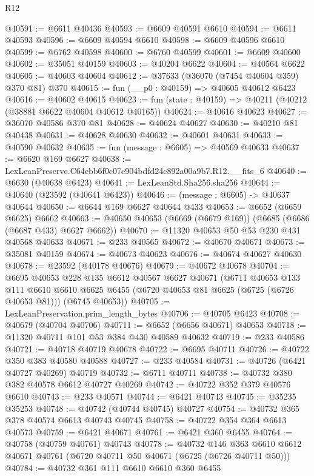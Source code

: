 \begin{lexlean}{R12}
\begin{coremodule}
@40591 := @6611 @40436
@40593 := @6609 @40591 @6610
@40594 := @6611 @40593
@40596 := @6609 @40594 @6610
@40598 := @6609 @40596 @6610
@40599 := @6762 @40598
@40600 := @6760 @40599
@40601 := @6609 @40600
@40602 := @35051 @40159
@40603 := @40204 @6622
@40604 := @40564 @6622
@40605 := @40603 @40604
@40612 := @37633 (@36070 (@7454 @40604 @359) @370 @81) @370
@40615 := fun (__p0 : @40159) => @40605 @40612 @6423
@40616 := @40602 @40615
@40623 := fun (state : @40159) => @40211 (@40212 (@38881 @6622 @40604 @40612 @40165))
@40624 := @40616 @40623
@40627 := @36070 @40586 @370 @81
@40628 := @40624 @40627
@40630 := @40210 @81 @40438
@40631 := @40628 @40630
@40632 := @40601 @40631
@40633 := @40590 @40632
@40635 := fun (message : @6605) => @40569 @40633
@40637 := @6620 @169 @6627
@40638 := LexLeanPreserve.C64ebb6f0c07e904bdfd24c892a00a9b7.R12.__fits_6
@40640 := @6630 (@40638 @6423)
@40641 := LexLeanStd.Sha256.sha256
@40644 := @40640 (@23592 (@40641 @6423))
@40646 := (message : @6605) -> @40637 @40644
@40650 := @6644 @169 @6627 @40644 @433
@40653 := @6652 (@6659 @6625) @6662
@40663 := @40650 @40653 (@6669 (@6679 @169)) (@6685 (@6686 (@6687 @433) @6627 @6662))
@40670 := @11320 @40653 @50 @53 @230 @431 @40568 @40633
@40671 := @233 @40565
@40672 := @40670 @40671
@40673 := @35081 @40159
@40674 := @40673 @40623
@40676 := @40674 @40627 @40630
@40678 := @23592 (@40178 @40676)
@40679 := @40672 @40678
@40704 := @6695
    @40653
    @228
    @135
    @6612
    @40567
    @6627
    @40671
    (@6711
      @40653
      @133
      @111
      @6610
      @6610
      @6625
      @6455
      (@6720 @40653 @81 @6625 (@6725 (@6726 @40653 @81)))
      (@6745 @40653))
@40705 := LexLeanPreservation.prim_length_bytes
@40706 := @40705 @6423
@40708 := @40679 (@40704 @40706)
@40711 := @6652 (@6656 @40671) @40653
@40718 := @11320 @40711 @101 @53 @384 @430 @40589 @40632
@40719 := @233 @40586
@40721 := @40718 @40719 @40678
@40722 := @6695 @40711
@40726 := @40722 @350 @383 @40580 @40588
@40727 := @233 @40584
@40731 := @40726 (@6421 @40727 @40269) @40719
@40732 := @6711 @40711
@40738 := @40732 @380 @382 @40578 @6612 @40727 @40269
@40742 := @40722 @352 @379 @40576 @6610
@40743 := @233 @40571
@40744 := @6421 @40743
@40745 := @35235 @35253
@40748 := @40742 (@40744 @40745) @40727
@40754 := @40732 @365 @378 @40574 @6613 @40743 @40745
@40758 := @40722 @354 @364 @6613 @40573
@40759 := @6421 @40671
@40761 := @6421 @360 @6455
@40764 := @40758 (@40759 @40761) @40743
@40778 := @40732
    @146
    @363
    @6610
    @6612
    @40671
    @40761
    (@6720 @40711 @50 @40671 (@6725 (@6726 @40711 @50)))
@40784 := @40732 @361 @111 @6610 @6610 @360 @6455

\end{coremodule}
\end{lexlean}
